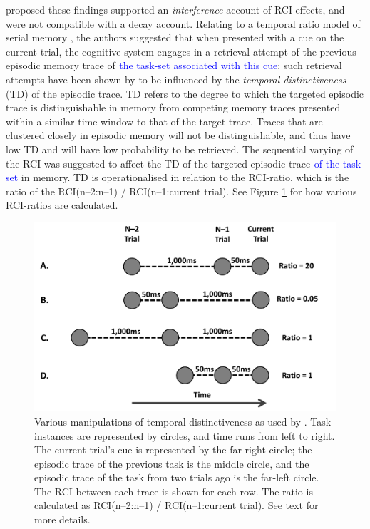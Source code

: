 \documentclass[a4paper, man, natbib]{apa6}
\newcommand{\jg}[1]{\textcolor{blue}{$^{\textrm{}}${#1}}}
\begin{document}
\cite{Horoufchin2011a} proposed these findings supported an \emph{interference} account of RCI effects, and were not compatible with a decay account. Relating to a temporal ratio model of serial memory \citep[SIMPLE][]{Brown2007}, the authors suggested that when presented with a cue on the current trial, the cognitive system engages in a retrieval attempt of the previous episodic memory trace of \jg{the task-set associated with this cue}; such retrieval attempts have been shown by \cite{Brown2007} to be influenced by the \emph{temporal distinctiveness} (TD) of the episodic trace. TD refers to the degree to which the targeted episodic trace is distinguishable in memory from competing memory traces presented within a similar time-window to that of the target trace. Traces that are clustered closely in episodic memory will not be distinguishable, and thus have low TD and will have low probability to be retrieved. The sequential varying of the RCI was suggested to affect the TD of the targeted episodic trace \jg{of the task-set} in memory. TD is operationalised in relation to the RCI-ratio, which is the ratio of the RCI(n--2:n--1) / RCI(n--1:current trial). See Figure \ref{fig:tdAccount} for how various RCI-ratios are calculated. 

\begin{figure} 
\begin{center}
\includegraphics[width = \textwidth]{Images/tdAccount.pdf}
\caption{Various manipulations of temporal distinctiveness as used by \cite{Horoufchin2011, Horoufchin2011a}. Task instances are represented by circles, and time runs from left to right. The current trial's cue is represented by the far-right circle; the episodic trace of the previous task is the middle circle, and the episodic trace of the task from two trials ago is the far-left circle. The RCI between each trace is shown for each row. The ratio is calculated as RCI(n--2:n--1) / RCI(n--1:current trial). See text for more details.}
\label{fig:tdAccount}
\end{center}
\end{figure}
\end{document}
